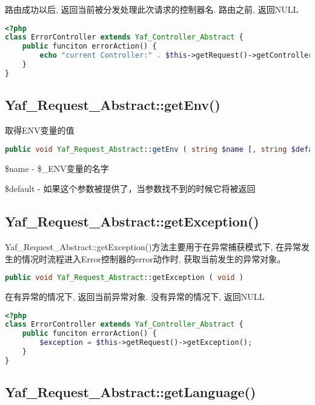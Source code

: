 路由成功以后, 返回当前被分发处理此次请求的控制器名. 路由之前, 返回NULL


\begin{lstlisting}[language=PHP]
<?php
class ErrorController extends Yaf_Controller_Abstract {
    public funciton errorAction() {
        echo "current Controller:" . $this->getRequest()->getControllerName();
    }
}
\end{lstlisting}

\subsection{Yaf\_Request\_Abstract::getEnv()}


取得ENV变量的值

\begin{lstlisting}[language=PHP]
public void Yaf_Request_Abstract::getEnv ( string $name [, string $default ] )
\end{lstlisting}

\begin{compactitem}
\item \$name - \$\_ENV变量的名字
\item \$default - 如果这个参数被提供了，当参数找不到的时候它将被返回
\end{compactitem}

\subsection{Yaf\_Request\_Abstract::getException()}


Yaf\_Request\_Abstract::getException()方法主要用于在异常捕获模式下, 在异常发生的情况时流程进入Error控制器的error动作时, 获取当前发生的异常对象。

\begin{lstlisting}[language=PHP]
public void Yaf_Request_Abstract::getException ( void )
\end{lstlisting}

在有异常的情况下, 返回当前异常对象. 没有异常的情况下, 返回NULL

\begin{lstlisting}[language=PHP]
<?php
class ErrorController extends Yaf_Controller_Abstract {
    public funciton errorAction() {
        $exception = $this->getRequest()->getException();
    }
}
\end{lstlisting}


\subsection{Yaf\_Request\_Abstract::getLanguage()}





